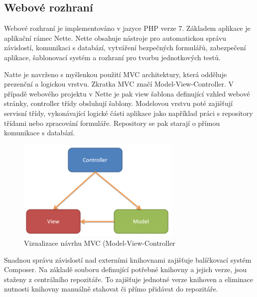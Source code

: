 \documentclass[thesis=B,czech]{FITthesis}[2012/06/26]
\begin{document}
\subsection{Webové rozhraní}
Webové rozhraní je implementováno v jazyce PHP verze 7. Základem aplikace je aplikační rámec Nette\cite{nette}. Nette
obsahuje nástroje pro automatickou správu závislostí, komunikaci s databází, vytváření bezpečných formulářů, zabezpečení
aplikace, šablonovací systém a rozhraní pro tvorbu jednotkových testů. 
\par
Natte je navrženo s myšlenkou použití MVC architektury, která odděluje
prezenční a logickou vrstvu. Zkratka MVC značí Model-View-Controller. V případě webového projektu v Nette je pak view šablona definující vzhled webové stránky, controller třídy obsluhují šablony. Modelovou vrstvu poté zajišťují servisní třídy, vykonávající logické části aplikace jako 
například práci s repository třídami nebo zpracování formuláře. Repository se pak starají o přímou komunikace s databází.

\begin{figure}[h]\centering
 	\includegraphics[width=0.7\textwidth]{resources/mvc}
	\caption[MVC]{Vizualizace návrhu MVC (Model-View-Controller}\label{fig:mvc}
\end{figure}
\par
Snadnou správu závislostí nad externími knihovnami zajišťuje balíčkovací systém Composer\cite{composer}. 
Na základě souboru definující potřebné knihovny a jejich verze, jsou staženy z centrálního repozitáře. To zajišťuje jednotné verze knihoven
a eliminace nutnosti knihovny manuálně stahovat či přímo přidávat do repozitáře.
\end{document}
